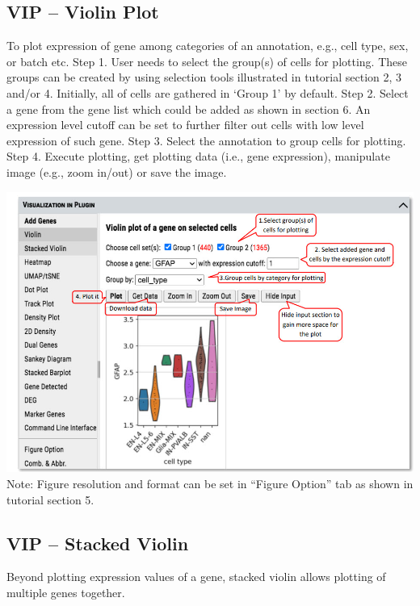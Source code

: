 \documentclass[
]{article}
\begin{document}
\hypertarget{vip-violin-plot}{%
\subsection{VIP -- Violin Plot}\label{vip-violin-plot}}

To plot expression of gene among categories of an annotation, e.g., cell type, sex, or batch etc.
Step 1. User needs to select the group(s) of cells for plotting. These groups can be created by using selection tools illustrated in tutorial section 2, 3 and/or 4. Initially, all of cells are gathered in `Group 1' by default.
Step 2. Select a gene from the gene list which could be added as shown in section 6. An expression level cutoff can be set to further filter out cells with low level expression of such gene.
Step 3. Select the annotation to group cells for plotting.
Step 4. Execute plotting, get plotting data (i.e., gene expression), manipulate image (e.g., zoom in/out) or save the image.

\includegraphics{figures/F7.jpg}
Note: Figure resolution and format can be set in ``Figure Option'' tab as shown in tutorial section 5.

\hypertarget{vip-stacked-violin}{%
\subsection{VIP -- Stacked Violin}\label{vip-stacked-violin}}

Beyond plotting expression values of a gene, stacked violin allows plotting of multiple genes together.
\end{document}
